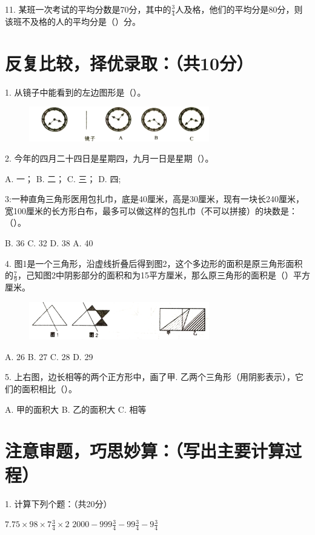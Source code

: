 \documentclass{../source/Paper}
\begin{document}
11. 某班一次考试的平均分数是70分，其中的$\displaystyle \frac{3}{4}$人及格，他们的平均分是80分，则该班不及格的人的平均分是（\qquad）分。

\section{反复比较，择优录取：（共10分）}
1. 从镜子中能看到的左边图形是（\qquad）。
\begin{figure}[H]
    \centering
    \includegraphics[width = 0.7\textwidth]{pic/2.1.png}
\end{figure}

2. 今年的四月二十四日是星期四，九月一日是星期（\qquad）。

A. 一；\qquad 
B. 二；\qquad 
C. 三；\qquad 
D. 四;\qquad 

3:一种直角三角形医用包扎巾，底是40厘米，高是30厘米，现有一块长240厘米，宽100厘米的长方形白布，最多可以做这样的包扎巾（不可以拼接）的块数是：（\qquad）。

B. 36\qquad 
C. 32\qquad 
D. 38\qquad 
A. 40\qquad 

4. 图1是一个三角形，沿虚线折叠后得到图2，这个多边形的面积是原三角形面积的$\displaystyle \frac{7}{9}$，己知图2中阴影部分的面积和为15平方厘米，那么原三角形的面积是（\qquad）平方厘米。
\begin{figure}[H]
    \centering
    \includegraphics[width = 0.7\textwidth]{pic/2.4.png}
\end{figure}
A. 26\qquad 
B. 27\qquad 
C. 28\qquad 
D. 29\qquad 


5. 上右图，边长相等的两个正方形中，画了甲. 乙两个三角形（用阴影表示），它们的面积相比（\qquad）。

A. 甲的面积大\qquad 
B. 乙的面积大\qquad 
C. 相等\qquad 

\section{注意审题，巧思妙算：（写出主要计算过程）}
1. 计算下列个题：（共20分）

\vspace{12pt}
$\displaystyle 7.75\times 98\times 7\frac{3}{4}\times2$ \hspace{5cm}
$\displaystyle 2000-999\frac{3}{4}-99\frac{3}{4}-9\frac{3}{4}$
\end{document}

